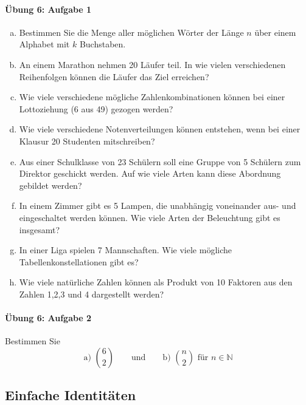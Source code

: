 \documentclass
[
  draft    = true,
  fontsize = 11pt,
  parskip  = half-,
  BCOR     = 0pt,
  DIV      = 11,
  ngerman,
  dvipsnames
]
{scrartcl}
\begin{document}
\paragraph{Übung 6: Aufgabe 1}
\begin{enumerate}[a)]
  \item Bestimmen Sie die Menge aller möglichen Wörter der Länge $n$ über einem Alphabet mit $k$ Buchstaben.
  \item An einem Marathon nehmen 20 Läufer teil. In wie vielen verschiedenen Reihenfolgen können die Läufer das Ziel erreichen?
  \item Wie viele verschiedene mögliche Zahlenkombinationen können bei einer Lottoziehung (6 aus 49) gezogen werden?
  \item Wie viele verschiedene Notenverteilungen können entstehen, wenn bei einer Klausur 20 Studenten mitschreiben?
  \item Aus einer Schulklasse von 23 Schülern soll eine Gruppe von 5 Schülern zum Direktor geschickt werden. Auf wie viele Arten kann diese Abordnung gebildet werden?
  \item In einem Zimmer gibt es 5 Lampen, die unabhängig voneinander aus- und eingeschaltet werden können. Wie viele Arten der Beleuchtung gibt es insgesamt?
  \item In einer Liga spielen 7 Mannschaften. Wie viele mögliche Tabellenkonstellationen gibt es?
  \item Wie viele natürliche Zahlen können als Produkt von 10 Faktoren aus den Zahlen 1,2,3 und 4 dargestellt werden?
\end{enumerate}

\paragraph{Übung 6: Aufgabe 2}
Bestimmen Sie
\begin{equation*}
  \text{a) }\binom{6}{2}
  \qquad
  \text{und}
  \qquad
  \text{b) }\binom{n}{2}\text{ für }n\in\mathbb{N}
\end{equation*}

\subsection{Einfache Identitäten}

\end{document}

